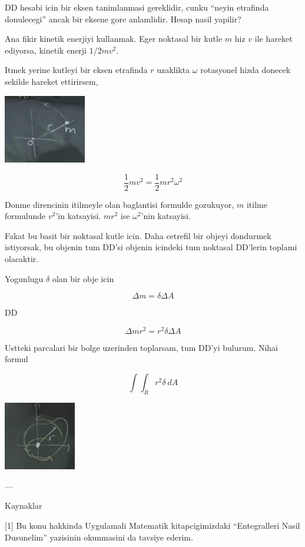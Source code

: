 \documentclass[12pt,fleqn]{article}
\begin{document}
DD hesabi icin bir eksen tanimlanmasi gereklidir, cunku ``neyin etrafinda
donulecegi'' ancak bir eksene gore anlamlidir. Hesap nasil yapilir? 

Ana fikir kinetik enerjiyi kullanmak. Eger noktasal bir kutle $m$ hiz $v$
ile hareket ediyorsa, kinetik enerji $1/2 mv^2$. 

Itmek yerine kutleyi bir eksen etrafinda $r$ uzaklikta $\omega$ rotasyonel
hizda donecek sekilde hareket ettirirsem,

\includegraphics[height=3cm]{17_4.png}

\[ \frac{1}{2}mv^2 = \frac{1}{2}mr^2\omega^2  \]

Donme direncinin itilmeyle olan baglantisi formulde gozukuyor, $m$ itilme
formulunde $v^2$'in katsayisi. $mr^2$ ise $\omega^2$'nin katsayisi.

Fakat bu basit bir noktasal kutle icin. Daha cetrefil bir objeyi dondurmek
istiyorsak, bu objenin tum DD'si objenin icindeki tum noktasal DD'lerin
toplami olacaktir. 

Yogunlugu $\delta$ olan bir obje icin 

\[ \Delta m = \delta \Delta A \]

DD

\[ \Delta m r^2 = r^2 \delta \Delta A \]

Ustteki parcalari bir bolge uzerinden toplarsam, tum DD'yi bulurum. Nihai
formul

\[ \int \int_R r^2 \delta \ dA \]

\includegraphics[height=3cm]{17_5.png}








---

Kaynaklar

[1] Bu konu hakkinda Uygulamali Matematik kitapcigimizdaki ``Entegralleri
Nasil Dusunelim'' yazisinin okunmasini da tavsiye ederim. 
\end{document}
